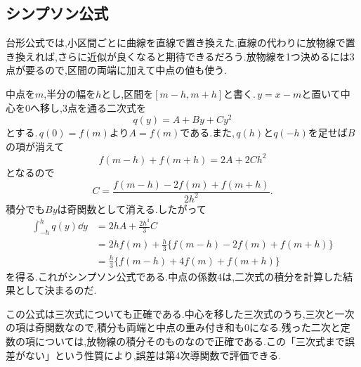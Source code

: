 \subsection{シンプソン公式}

台形公式では,小区間ごとに曲線を直線で置き換えた.直線の代わりに放物線で置き換えれば,さらに近似が良くなると期待できるだろう.放物線を1つ決めるには3点が要るので,区間の両端に加えて中点の値も使う.

中点を$m$,半分の幅を$h$とし,区間を$[m-h,m+h]$と書く.\,$y=x-m$と置いて中心を$0$へ移し,3点を通る二次式を
\[
 q(y)=A+By+Cy^2
\]
とする.\,$q(0)=f(m)$より$A=f(m)$である.また,\,$q(h)$と$q(-h)$を足せば$B$の項が消えて
\[
 f(m-h)+f(m+h)=2A+2Ch^2
\]
となるので
\[
 C=\frac{f(m-h)-2f(m)+f(m+h)}{2h^2}.
\]
積分でも$By$は奇関数として消える.したがって
\begin{align*}
 \int_{-h}^hq(y)\dd y
 &=2hA+\frac{2h^3}{3}C\\
 &=2hf(m)+\frac h3\{f(m-h)-2f(m)+f(m+h)\}\\
 &=\frac h3\{f(m-h)+4f(m)+f(m+h)\}
\end{align*}
を得る.これがシンプソン公式である.中点の係数$4$は,二次式の積分を計算した結果として決まるのだ.

この公式は三次式についても正確である.中心を移した三次式のうち,三次と一次の項は奇関数なので,積分も両端と中点の重み付き和も$0$になる.残った二次と定数の項については,放物線の積分そのものなので正確である.この「三次式まで誤差がない」という性質により,誤差は第4次導関数で評価できる.
